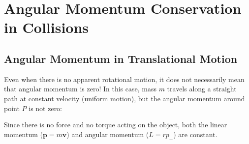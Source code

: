 \section{Angular Momentum Conservation in Collisions}

\subsection{Angular Momentum in Translational Motion}
Even when there is no apparent rotational motion, it does not necessarily
mean that angular momentum is zero! In this case, mass $m$ travels along a
straight path at constant velocity (uniform motion), but the angular momentum
around point $P$ is not zero:
\begin{figure}[ht]
  \centering
\end{figure}
Since there is no force and no torque acting on the object, both the linear
momentum ($\bm p=m\bm v$) and angular momentum ($L=rp_\perp$) are constant.




